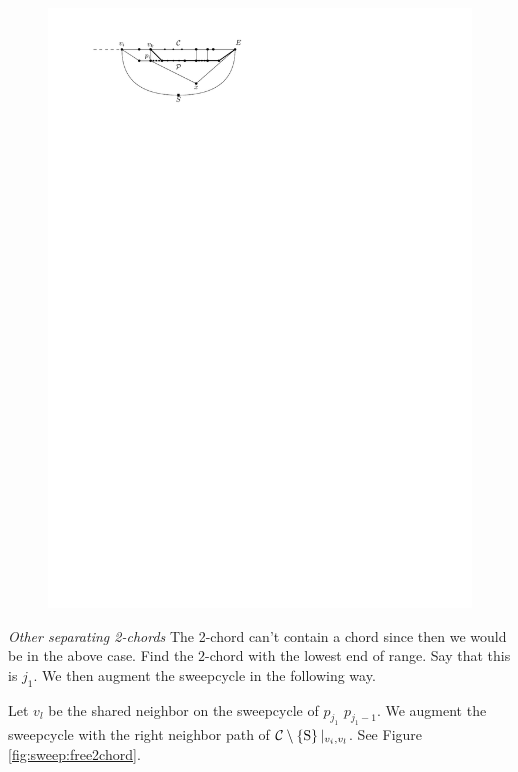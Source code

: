     \begin{figure}[h]
      \centering
      \includegraphics[scale=1]{unifiedAlgo/img/sweep/pEBound}
      \caption{}
      \label{fig:sweep:pEBound}
    \end{figure}
    \emph{Other separating 2-chords}
    The 2-chord can't contain a chord since then we would be in the above case.
    Find the $2$-chord with the lowest end of range. Say that this is $j_1$. We then augment the sweepcycle in the following way.

    Let $v_l$ be the shared neighbor on the sweepcycle of $p_{j_1}$ $p_{j_1 -1}$. We augment the sweepcycle with the right neighbor path of $\mathcal{C} \setminus \left\lbrace {\mathrm{S}} \right\rbrace|_{v_i, v_l}$. See Figure \ref{fig:sweep:free2chord}.

